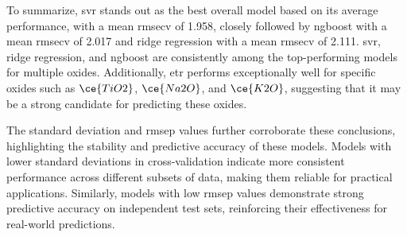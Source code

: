 To summarize, \gls{svr} stands out as the best overall model based on its average performance, with a mean \gls{rmsecv} of 1.958, closely followed by \gls{ngboost} with a mean \gls{rmsecv} of 2.017 and ridge regression with a mean \gls{rmsecv} of 2.111. \gls{svr}, ridge regression, and \gls{ngboost} are consistently among the top-performing models for multiple oxides.
Additionally, \gls{etr} performs exceptionally well for specific oxides such as $\ce{TiO2}$, $\ce{Na2O}$, and $\ce{K2O}$, suggesting that it may be a strong candidate for predicting these oxides.

The standard deviation and \gls{rmsep} values further corroborate these conclusions, highlighting the stability and predictive accuracy of these models.
Models with lower standard deviations in cross-validation indicate more consistent performance across different subsets of data, making them reliable for practical applications.
Similarly, models with low \gls{rmsep} values demonstrate strong predictive accuracy on independent test sets, reinforcing their effectiveness for real-world predictions.

